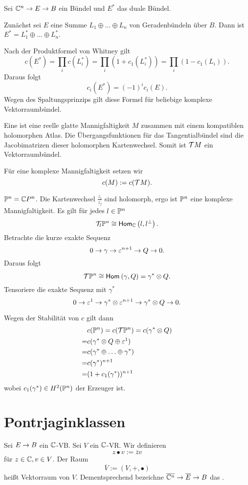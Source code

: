 
Sei $\C^n \pfeil{} E \pfeil{} B$ ein Bündel und $E^*$ das duale Bündel.

Zunächst sei $E$ eine Summe $L_1 \oplus \ldots \oplus L_n$ von Geradenbündeln über $B$. Dann ist $E^* = L_1^* \oplus \ldots \oplus L_n^*$.

Nach der Produktformel von Whitney gilt
\[ c(E^*) = \prod_i c(L_i^*) = \prod_i (1 + c_1(L_i^*)) = \prod_i (1 - c_1(L_i)). \]
Daraus folgt
\[ c_i(E^*) = (-1)^i c_i(E). \]
Wegen des Spaltungsprinzips gilt diese Formel für beliebige komplexe Vektorraumbündel.

\Def{}
Eine  ist eine reelle glatte Mannigfaltigkeit $M$ zusammen mit einem kompatiblen holomorphen Atlas. Die Übergangsfunktionen für das Tangentialbündel sind die Jacobimatrizen dieser holomorphen Kartenwechsel. Somit ist $\T M$ ein  Vektorraumbündel.

Für eine komplexe Mannigfaltigkeit setzen wir
\[ c(M) := c(\T M). \]

\Bsp{}
$\P^n = \C P^n$. Die Kartenwechsel $\frac{z_i}{z_j}$ sind holomorph, ergo ist $\P^n$ eine komplexe Mannigfaltigkeit. Es gilt für jedes $l \in \P^n$
\[ \T_l\P^n \isom{} \Hom{\C}{l}{l^\bot}. \]
Betrachte die kurze exakte Sequenz
\[ 0 \pfeil{} \gamma \pfeil{} \e^{n+1}  \pfeil{} Q \pfeil{} 0. \]
Daraus folgt
\[ \T \P^n \isom{} \Hom{}{\gamma}{Q} = \gamma^* \otimes Q. \]
Tensoriere die exakte Sequenz mit $\gamma^*$
\[ 0 \pfeil{} \e^1 \pfeil{} \gamma^* \otimes \e^{n+1}  \pfeil{} \gamma^* \otimes Q \pfeil{} 0. \]

Wegen der Stabilität von $c$ gilt dann
\begin{align*}
&c(\P^n) = c(\T \P^n) = c(\gamma^* \otimes Q) \\
=& c(\gamma^* \otimes Q \oplus \e^1)\\
=& c(\gamma^* \oplus \ldots \oplus \gamma^*)\\
=& c(\gamma^*)^{n+1}\\
=& (1 + c_1(\gamma^*))^{n+1}
\end{align*}
wobei $c_1(\gamma^*) \in H^2(\P^n)$ der Erzeuger ist.

\newpage
\section{Pontrjaginklassen}
Sei $E \pfeil{} B$ ein $\C$-VB. Sei $V$ ein $\C$-VR. Wir definieren
\[ z\bullet v := \overline{z}v \]
für $z \in \C, v\in V$. Der Raum
\[ \overline{V} := (V, +, \bullet) \]
heißt  Vektorraum von $V$. Dementsprechend bezeichne $\overline{\C^n} \pfeil{} \overline{E} \pfeil{} B$ das .

